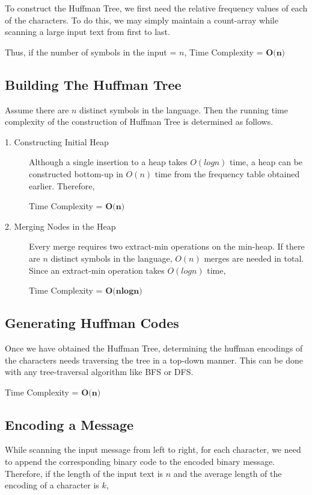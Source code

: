 \documentclass[18pt]{article}
\begin{document}
To construct the Huffman Tree, we first need the relative frequency values of each of the characters. To do this, we may simply maintain a count-array while scanning a large input text from first to last.

Thus, if the number of symbols in the input = $n$, Time Complexity = $\textbf{O(n)}$

\subsection{Building The Huffman Tree}

Assume there are $n$ distinct symbols in the language. Then the running time complexity of the construction of Huffman Tree is determined as follows.

\begin{description}
	
	\item[1. Constructing Initial Heap] 
	Although a single insertion to a heap takes $O(logn)$ time, a heap can be constructed bottom-up in $O(n)$ time from the frequency table obtained earlier. Therefore,
	
	Time Complexity = $\textbf{O(n)}$
	
	\item[2. Merging Nodes in the Heap] 
	Every merge requires two extract-min operations on the min-heap. If there are $n$ distinct symbols in the language, $O(n)$ merges are needed in total. Since an extract-min operation takes $O(logn)$ time, 
	
	Time Complexity = $\textbf{O(nlogn)}$
	
\end{description}

\subsection{Generating Huffman Codes}
Once we have obtained the Huffman Tree, determining the huffman encodings of the characters needs traversing the tree in a top-down manner. This can be done with any tree-traversal algorithm like BFS or DFS.

Time Complexity = $\textbf{O(n)}$

\subsection{Encoding a Message}

While scanning the input message from left to right, for each character, we need to append the corresponding binary code to the encoded binary message. Therefore, if the length of the input text is $n$ and the average length of the encoding of a character is $k$, 
\end{document}
